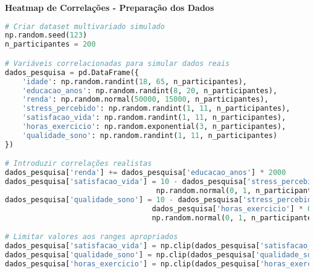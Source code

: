 \begin{researchbox}
\textbf{Heatmap de Correlações - Preparação dos Dados}

\begin{lstlisting}[language=Python]
# Criar dataset multivariado simulado
np.random.seed(123)
n_participantes = 200

# Variáveis correlacionadas para simular dados reais
dados_pesquisa = pd.DataFrame({
    'idade': np.random.randint(18, 65, n_participantes),
    'educacao_anos': np.random.randint(8, 20, n_participantes),
    'renda': np.random.normal(50000, 15000, n_participantes),
    'stress_percebido': np.random.randint(1, 11, n_participantes),
    'satisfacao_vida': np.random.randint(1, 11, n_participantes),
    'horas_exercicio': np.random.exponential(3, n_participantes),
    'qualidade_sono': np.random.randint(1, 11, n_participantes)
})

# Introduzir correlações realistas
dados_pesquisa['renda'] += dados_pesquisa['educacao_anos'] * 2000
dados_pesquisa['satisfacao_vida'] = 10 - dados_pesquisa['stress_percebido'] + \
                                   np.random.normal(0, 1, n_participantes)
dados_pesquisa['qualidade_sono'] = 10 - dados_pesquisa['stress_percebido'] * 0.5 + \
                                  dados_pesquisa['horas_exercicio'] * 0.3 + \
                                  np.random.normal(0, 1, n_participantes)

# Limitar valores aos ranges apropriados
dados_pesquisa['satisfacao_vida'] = np.clip(dados_pesquisa['satisfacao_vida'], 1, 10)
dados_pesquisa['qualidade_sono'] = np.clip(dados_pesquisa['qualidade_sono'], 1, 10)
dados_pesquisa['horas_exercicio'] = np.clip(dados_pesquisa['horas_exercicio'], 0, 15)
\end{lstlisting}
\end{researchbox}

